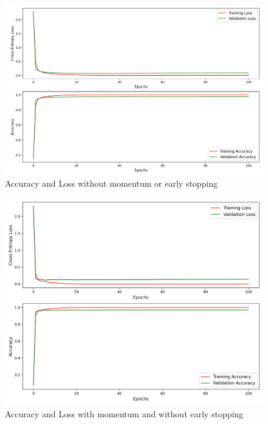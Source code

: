 \begin{figure}[!h]
	\centering
	\includegraphics[width=1.0\textwidth]{./images/no_momentum_no_early_stop.png}
	\caption{Accuracy and Loss without momentum or early stopping}
	\label{fig:no_momentum_no_early_stop}
\end{figure}
\begin{figure}[!h]
	\centering
	\includegraphics[width=1.0\textwidth]{./images/momentum_no_early_stop.png}
	\caption{Accuracy and Loss with momentum and without early stopping}
	\label{fig:momentum_no_early_stop}
\end{figure}

